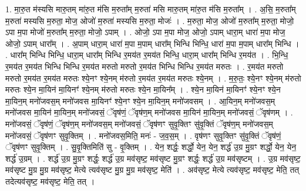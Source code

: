 \documentclass[17pt]{extarticle}
\begin{document}
1. मा॒रु॒त म॑स्यसि मारु॒तम् मा॑रु॒त म॑सि म॒रुता᳚म् म॒रुता॑ मसि मारु॒तम् मा॑रु॒त म॑सि म॒रुता᳚म् । . अ॒सि॒ म॒रुता᳚म् म॒रुता॑ मस्यसि म॒रुता॒ मोज॒ ओजो॑ म॒रुता॑ मस्यसि म॒रुता॒ मोजः॑ । . म॒रुता॒ मोज॒ ओजो॑ म॒रुता᳚म् म॒रुता॒ मोजो॒ ऽपा म॒पा मोजो॑ म॒रुता᳚म् म॒रुता॒ मोजो॒ ऽपाम् । . ओजो॒ ऽपा म॒पा मोज॒ ओजो॒ ऽपाम् धारा॒म् धारा॑ म॒पा मोज॒ ओजो॒ ऽपाम् धारा᳚म् । . अ॒पाम् धारा॒म् धारा॑ म॒पा म॒पाम् धारा᳚म् भिन्धि भिन्धि॒ धारा॑ म॒पा म॒पाम् धारा᳚म् भिन्धि । . धारा᳚म् भिन्धि भिन्धि॒ धारा॒म् धारा᳚म् भिन्धि र॒मय॑त र॒मय॑त भिन्धि॒ धारा॒म् धारा᳚म् भिन्धि र॒मय॑त । . भि॒न्धि॒ र॒मय॑त र॒मय॑त भिन्धि भिन्धि र॒मय॑त मरुतो मरुतो र॒मय॑त भिन्धि भिन्धि र॒मय॑त मरुतः । . र॒मय॑त मरुतो मरुतो र॒मय॑त र॒मय॑त मरुतः श्ये॒नꣳ श्ये॒नम् म॑रुतो र॒मय॑त र॒मय॑त मरुतः श्ये॒नम् । . म॒रु॒तः॒ श्ये॒नꣳ श्ये॒नम् म॑रुतो मरुतः श्ये॒न मा॒यिन॑ मा॒यिनꣳ॑ श्ये॒नम् म॑रुतो मरुतः श्ये॒न मा॒यिन᳚म् । . श्ये॒न मा॒यिन॑ मा॒यिनꣳ॑ श्ये॒नꣳ श्ये॒न मा॒यिन॒म् मनो॑जवस॒म् मनो॑जवस मा॒यिनꣳ॑ श्ये॒नꣳ श्ये॒न मा॒यिन॒म् मनो॑जवसम् । . आ॒यिन॒म् मनो॑जवस॒म् मनो॑जवस मा॒यिन॑ मा॒यिन॒म् मनो॑जवसं॒ ॅवृष॑णं॒ ॅवृष॑ण॒म् मनो॑जवस मा॒यिन॑ मा॒यिन॒म् मनो॑जवसं॒ ॅवृष॑णम् । . मनो॑जवसं॒ ॅवृष॑णं॒ ॅवृष॑ण॒म् मनो॑जवस॒म् मनो॑जवसं॒ ॅवृष॑णꣳ सुवृ॒क्तिꣳ सु॑वृ॒क्तिं ॅवृष॑ण॒म् मनो॑जवस॒म् मनो॑जवसं॒ ॅवृष॑णꣳ सुवृ॒क्तिम् । . मनो॑जवस॒मिति॒ मनः॑ - ज॒व॒स॒म् । . वृष॑णꣳ सुवृ॒क्तिꣳ सु॑वृ॒क्तिं ॅवृष॑णं॒ ॅवृष॑णꣳ सुवृ॒क्तिम् । . सु॒वृ॒क्तिमिति॑ सु - वृ॒क्तिम् । . येन॒ शर्द्धः॒ शर्द्धो॒ येन॒ येन॒ शर्द्ध॑ उ॒ग्र मु॒ग्रꣳ शर्द्धो॒ येन॒ येन॒ शर्द्ध॑ उ॒ग्रम् । . शर्द्ध॑ उ॒ग्र मु॒ग्रꣳ शर्द्धः॒ शर्द्ध॑ उ॒ग्र मव॑सृष्ट॒ मव॑सृष्ट मु॒ग्रꣳ शर्द्धः॒ शर्द्ध॑ उ॒ग्र मव॑सृष्टम् । . उ॒ग्र मव॑सृष्ट॒ मव॑सृष्ट मु॒ग्र मु॒ग्र मव॑सृष्ट॒ मेत्ये त्यव॑सृष्ट मु॒ग्र मु॒ग्र मव॑सृष्ट॒ मेति॑ । . अव॑सृष्ट॒ मेत्ये त्यव॑सृष्ट॒ मव॑सृष्ट॒ मेति॒ तत् तदेत्यव॑सृष्ट॒ मव॑सृष्ट॒ मेति॒ तत् । \newline
\end{document}
